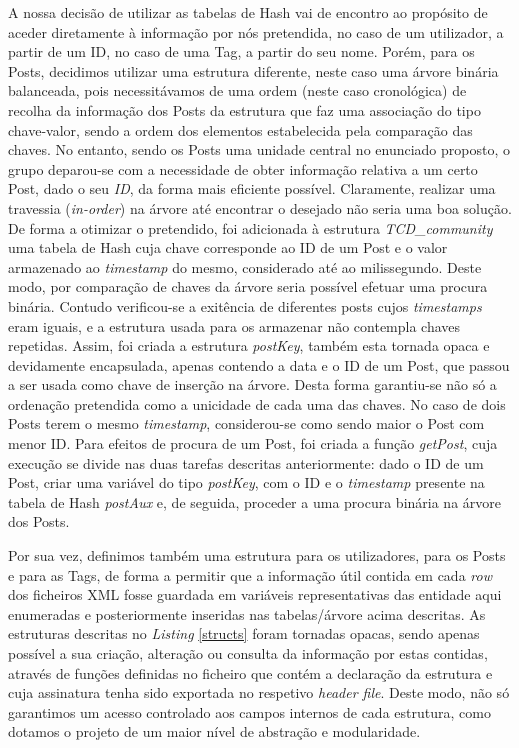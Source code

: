 \documentclass[a4paper, 11pt, oneside]{article}
\begin{document}
A nossa decisão de utilizar as tabelas de Hash vai de encontro ao propósito de aceder diretamente à informação por nós pretendida, no caso de um utilizador, a partir de um ID, no caso de uma Tag, a partir do seu nome. Porém, para os Posts, decidimos utilizar uma estrutura diferente, neste caso uma árvore binária balanceada, pois necessitávamos de uma ordem (neste caso cronológica) de recolha da informação dos Posts da estrutura que faz uma associação do tipo chave-valor, sendo a ordem dos elementos estabelecida pela comparação das chaves. No entanto, sendo os Posts uma unidade central no enunciado proposto, o grupo deparou-se com a necessidade de obter informação relativa a um certo Post, dado o seu \textit{ID}, da forma mais eficiente possível. Claramente, realizar uma travessia (\textit{in-order}) na árvore até encontrar o desejado não seria uma boa solução. De forma a otimizar o pretendido, foi adicionada à estrutura \textit{TCD\_community} uma tabela de Hash cuja chave corresponde ao ID de um Post e o valor armazenado ao \textit{timestamp} do mesmo, considerado até ao milissegundo. Deste modo, por comparação de chaves da árvore seria possível efetuar uma procura binária. Contudo verificou-se a exitência de diferentes posts cujos \textit{timestamps} eram iguais, e a estrutura usada para os armazenar não contempla chaves repetidas. Assim, 
foi criada a estrutura \textit{postKey}, também esta tornada opaca e devidamente encapsulada, apenas contendo a data e o ID de um Post, que passou a ser usada como chave de inserção na árvore. Desta forma garantiu-se não só a ordenação pretendida como a unicidade de cada uma das chaves. No caso de dois Posts terem o mesmo \textit{timestamp}, considerou-se como sendo maior o Post com menor ID. Para efeitos de procura de um Post, foi criada a função \textit{getPost}, cuja execução se divide nas duas tarefas descritas anteriormente: dado o ID de um Post, criar uma variável do tipo \textit{postKey}, com o ID e o \textit{timestamp} presente na tabela de Hash \textit{postAux} e, de seguida, proceder a uma procura binária na árvore dos Posts.

Por sua vez, definimos também uma estrutura para os utilizadores, para os Posts e para as Tags, de forma a permitir que a informação útil contida em cada \textit{row} dos ficheiros XML fosse guardada em variáveis representativas das entidade aqui enumeradas e posteriormente inseridas nas tabelas/árvore acima descritas. As estruturas descritas no \textit{Listing} \ref{structs} foram tornadas opacas, sendo apenas possível a sua criação, alteração ou consulta da informação por estas contidas, através de funções definidas no ficheiro que contém a declaração da estrutura e cuja assinatura tenha sido exportada no respetivo \textit{header file}. Deste modo, não só garantimos um acesso controlado aos campos internos de cada estrutura, como dotamos o projeto de um maior nível de abstração e modularidade.
\end{document}
